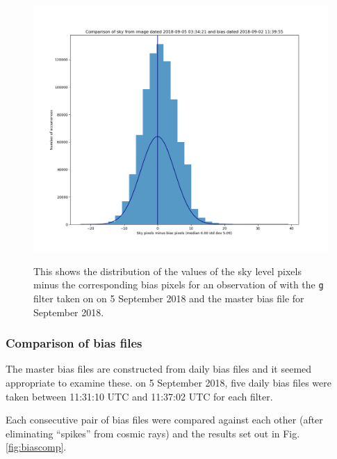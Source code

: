 \begin{figure}[!htbp]
\begin{center}
\includegraphics[scale=0.5]{images/negbiaseg.png}
\end{center}   
\caption{This shows the distribution of the values of the sky level pixels minus
the corresponding bias pixels for an observation of {\bstar} with the \texttt{g}
filter taken on on 5 September 2018 and the master bias file for September 2018.}
\protect\label{fig:negbiaseg}
\end{figure}

\subsubsection{Comparison of bias files}

The master bias files are constructed from daily bias files and it seemed
appropriate to examine these. on 5 September 2018, five daily bias files were
taken between 11:31:10 UTC and 11:37:02 UTC for each filter.

Each consecutive pair of bias files were compared against each other (after
eliminating ``spikes'' from cosmic rays) and the results set out in Fig.
\ref{fig:biascomp}.

